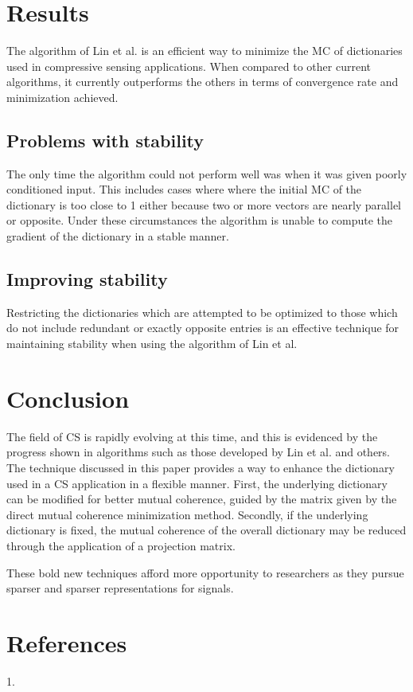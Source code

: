 \documentclass[journal]{IEEEtran}
\begin{document}
\section{Results}
The algorithm of Lin et al. is an efficient way to minimize the MC of dictionaries used
in compressive sensing applications. When compared to other current algorithms, it currently
outperforms the others in terms of convergence rate and minimization achieved.
\subsection{Problems with stability}
The only time the algorithm could not perform well was
when it was given poorly conditioned input. This includes cases where where the initial MC of the
dictionary is too close to 1 either because two or more vectors are nearly parallel or opposite. Under these circumstances the algorithm is unable to compute the gradient of the dictionary in a stable manner.

\subsection{Improving stability}
Restricting the dictionaries which are attempted to be optimized to those which do not 
include redundant or exactly opposite entries is an effective technique for maintaining stability 
when using the algorithm of Lin et al.
\section{Conclusion}
The field of CS is rapidly evolving at this time, and this is evidenced by the progress shown
in algorithms such as those developed by Lin et al. and others. The technique discussed in this paper 
provides a way to enhance the dictionary used in a CS application in a flexible manner. First, the 
underlying dictionary can be modified for better mutual coherence, guided by the matrix given by the 
direct mutual coherence minimization method. Secondly, if the underlying dictionary is fixed, the 
mutual coherence of the overall dictionary may be reduced through the application of a projection
matrix.

These bold new techniques afford more opportunity to researchers as they pursue sparser and sparser
representations for signals.
\section{References}
1.
\end{document}
